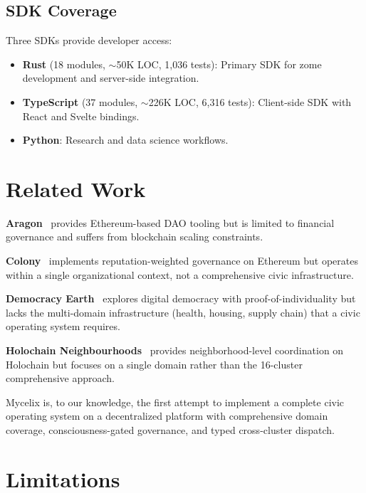\documentclass[11pt,twocolumn]{article}
\begin{document}
\subsection{SDK Coverage}

Three SDKs provide developer access:

\begin{itemize}[nosep]
  \item \textbf{Rust} (18 modules, $\sim$50K LOC, 1,036 tests): Primary SDK
    for zome development and server-side integration.
  \item \textbf{TypeScript} (37 modules, $\sim$226K LOC, 6,316 tests): Client-side
    SDK with React and Svelte bindings.
  \item \textbf{Python}: Research and data science workflows.
\end{itemize}

\section{Related Work}

\textbf{Aragon}~\cite{aragon2017} provides Ethereum-based DAO tooling but is
limited to financial governance and suffers from blockchain scaling constraints.

\textbf{Colony}~\cite{colony2018} implements reputation-weighted governance on
Ethereum but operates within a single organizational context, not a comprehensive
civic infrastructure.

\textbf{Democracy Earth}~\cite{siri2017} explores digital democracy with
proof-of-individuality but lacks the multi-domain infrastructure (health,
housing, supply chain) that a civic operating system requires.

\textbf{Holochain Neighbourhoods}~\cite{neighbourhoods2022} provides
neighborhood-level coordination on Holochain but focuses on a single domain
rather than the 16-cluster comprehensive approach.

Mycelix is, to our knowledge, the first attempt to implement a complete civic
operating system on a decentralized platform with comprehensive domain coverage,
consciousness-gated governance, and typed cross-cluster dispatch.

\section{Limitations}
\end{document}
